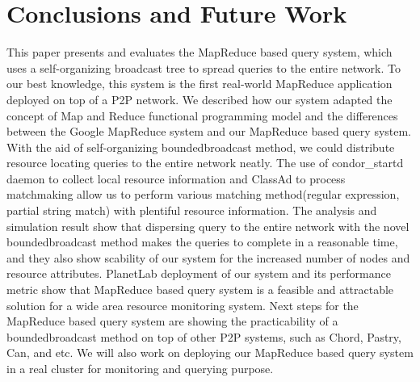 \documentclass{acm_proc_article-sp}
\begin{document}
\section{Conclusions and Future Work}
This paper presents and evaluates the MapReduce based query system, which uses a self-organizing broadcast tree to spread queries to the entire network.
To our best knowledge, this system is the first real-world MapReduce application deployed on top of a P2P network.
We described how our system adapted the concept of Map and Reduce functional programming model and the differences between the Google MapReduce system and our MapReduce based query system.
With the aid of self-organizing boundedbroadcast method, we could distribute resource locating queries to the entire network neatly. 
The use of condor\_startd daemon to collect local resource information and ClassAd to process matchmaking allow us to perform various matching method(regular expression, partial string match) with plentiful resource information.
The analysis and simulation result show that dispersing query to the entire network with the novel boundedbroadcast method makes the queries to complete in a reasonable time, 
and they also show scability of our system for the increased number of nodes and resource attributes.
PlanetLab deployment of our system and its performance metric show that MapReduce based query system is a feasible and attractable solution for a wide area resource monitoring system.
Next steps for the MapReduce based query system are showing the practicability of a boundedbroadcast method on top of other P2P systems, such as Chord, Pastry, Can, and etc.
We will also work on deploying our MapReduce based query system in a real cluster for monitoring and querying purpose.


\balancecolumns
\end{document}
